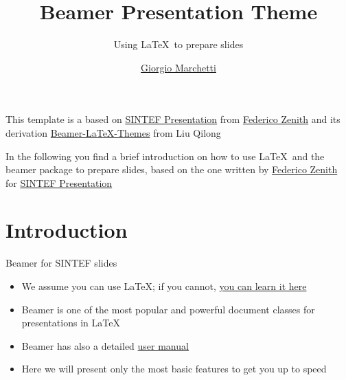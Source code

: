 \documentclass{beamer}
\title{Beamer Presentation Theme}
\subtitle{Using \LaTeX\ to prepare slides}
\author{\href{mailto:ciao@gio.im}{Giorgio Marchetti}}
\newcommand{\hrefcol}[2]{\textcolor{cyan}{\href{#1}{#2}}}
\begin{document}
\maketitle

\begin{frame}

      This template is a based on \hrefcol{https://www.overleaf.com/latex/templates/sintef-presentation/jhbhdffczpnx}{SINTEF
            Presentation} from \hrefcol{mailto:federico.zenith@sintef.no}{Federico Zenith} and its derivation
      \hrefcol{https://github.com/TOB-KNPOB/Beamer-LaTeX-Themes}{Beamer-LaTeX-Themes} from Liu Qilong

      \vspace{\baselineskip}

      In the following you find a brief introduction on how to use \LaTeX\ and the beamer package to prepare slides, based on
      the one written by \hrefcol{mailto:federico.zenith@sintef.no}{Federico Zenith} for
      \hrefcol{https://www.overleaf.com/latex/templates/sintef-presentation/jhbhdffczpnx}{SINTEF Presentation}


\end{frame}

\section{Introduction}

\begin{frame}{Beamer for SINTEF slides}
      \begin{itemize}
            \item We assume you can use \LaTeX; if you cannot, \hrefcol{http://en.wikibooks.org/wiki/LaTeX/}{you can learn it here}
            \item Beamer is one of the most popular and powerful document classes for presentations in \LaTeX
            \item Beamer has also a detailed
                  \hrefcol{http://www.ctan.org/tex-archive/macros/latex/contrib/beamer/doc/beameruserguide.pdf}{user manual}
            \item Here we will present only the most basic features to get you up to speed
      \end{itemize}
\end{frame}
\end{document}
